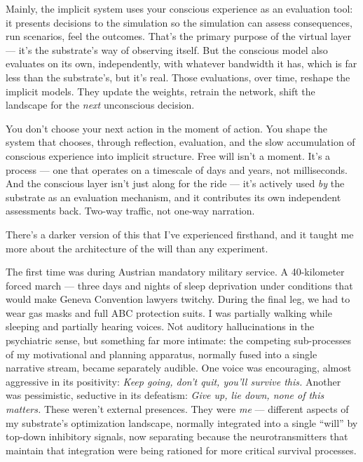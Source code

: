 \documentclass[11pt, twoside, openright]{book}
\begin{document}
Mainly, the implicit system uses your conscious experience as an evaluation tool: it presents decisions to the simulation so the simulation can assess consequences, run scenarios, feel the outcomes. That's the primary purpose of the virtual layer --- it's the substrate's way of observing itself. But the conscious model also evaluates on its own, independently, with whatever bandwidth it has, which is far less than the substrate's, but it's real. Those evaluations, over time, reshape the implicit models. They update the weights, retrain the network, shift the landscape for the \textit{next} unconscious decision.

You don't choose your next action in the moment of action. You shape the system that chooses, through reflection, evaluation, and the slow accumulation of conscious experience into implicit structure. Free will isn't a moment. It's a process --- one that operates on a timescale of days and years, not milliseconds. And the conscious layer isn't just along for the ride --- it's actively used \textit{by} the substrate as an evaluation mechanism, and it contributes its own independent assessments back. Two-way traffic, not one-way narration.

There's a darker version of this that I've experienced firsthand, and it taught me more about the architecture of the will than any experiment.

The first time was during Austrian mandatory military service. A 40-kilometer forced march --- three days and nights of sleep deprivation under conditions that would make Geneva Convention lawyers twitchy. During the final leg, we had to wear gas masks and full ABC protection suits. I was partially walking while sleeping and partially hearing voices. Not auditory hallucinations in the psychiatric sense, but something far more intimate: the competing sub-processes of my motivational and planning apparatus, normally fused into a single narrative stream, became separately audible. One voice was encouraging, almost aggressive in its positivity: \textit{Keep going, don't quit, you'll survive this.} Another was pessimistic, seductive in its defeatism: \textit{Give up, lie down, none of this matters.} These weren't external presences. They were \textit{me} --- different aspects of my substrate's optimization landscape, normally integrated into a single ``will'' by top-down inhibitory signals, now separating because the neurotransmitters that maintain that integration were being rationed for more critical survival processes.
\end{document}
